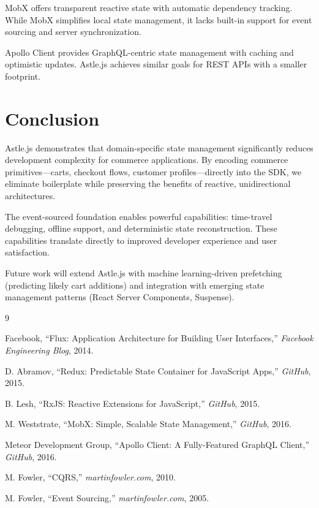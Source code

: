 \documentclass[11pt,twocolumn]{article}
\begin{document}
MobX \cite{mobx2016} offers transparent reactive state with automatic dependency tracking. While MobX simplifies local state management, it lacks built-in support for event sourcing and server synchronization.

Apollo Client \cite{apollo2016} provides GraphQL-centric state management with caching and optimistic updates. Astle.js achieves similar goals for REST APIs with a smaller footprint.

\section{Conclusion}

Astle.js demonstrates that domain-specific state management significantly reduces development complexity for commerce applications. By encoding commerce primitives—carts, checkout flows, customer profiles—directly into the SDK, we eliminate boilerplate while preserving the benefits of reactive, unidirectional architectures.

The event-sourced foundation enables powerful capabilities: time-travel debugging, offline support, and deterministic state reconstruction. These capabilities translate directly to improved developer experience and user satisfaction.

Future work will extend Astle.js with machine learning-driven prefetching (predicting likely cart additions) and integration with emerging state management patterns (React Server Components, Suspense).

\begin{thebibliography}{9}

Facebook, ``Flux: Application Architecture for Building User Interfaces,'' \textit{Facebook Engineering Blog}, 2014.

D. Abramov, ``Redux: Predictable State Container for JavaScript Apps,'' \textit{GitHub}, 2015.

B. Lesh, ``RxJS: Reactive Extensions for JavaScript,'' \textit{GitHub}, 2015.

M. Weststrate, ``MobX: Simple, Scalable State Management,'' \textit{GitHub}, 2016.

Meteor Development Group, ``Apollo Client: A Fully-Featured GraphQL Client,'' \textit{GitHub}, 2016.

M. Fowler, ``CQRS,'' \textit{martinfowler.com}, 2010.

M. Fowler, ``Event Sourcing,'' \textit{martinfowler.com}, 2005.

\end{thebibliography}
\end{document}
